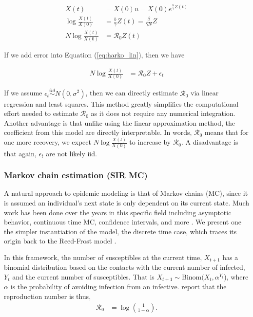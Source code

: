 \documentclass[12pt]{article}
\newcommand{\rr}{\ensuremath{\mathcal{R}_0}}
\begin{document}
\begin{align}
  X(t) &= X(0) u  = X(0) e^{\frac{b}{\gamma}Z(t)} \nonumber\\
  \log \frac{X(t)}{X(0)} &=  \frac{b}{\gamma}Z(t) =  \frac{\beta}{\gamma N} Z \nonumber\\
  N\log \frac{X(t)}{X(0)} &=  \rr Z(t) \label{eq:harko_lin}
\end{align}

If we add error into Equation (\ref{eq:harko_lin}), then we have

\begin{align}
N  \log \frac{X(t)}{X(0)} &=  \rr Z  + \epsilon_t\label{eq:r0_harko}
\end{align}

If we assume $\epsilon_t \overset{iid}{\sim}N(0, \sigma^2)$, then we can directly estimate $\rr$ via linear regression and least squares.  This method greatly simplifies the computational effort needed to estimate $\rr$ as it does not require any numerical integration.  Another advantage is that unlike using the linear approximation method, the coefficient from this model are directly interpretable.  In words, $\rr$ means that for one more recovery, we expect $N \log \frac{X(t)}{X(0)}$ to increase by $\rr$.  A disadvantage is that again, $\epsilon_t$ are  not likely iid.

\subsubsection{Markov chain estimation (SIR MC)}
A natural approach to epidemic modeling is that of Markov chains (MC), since it is assumed an individual's next state is only dependent on its current state.  Much work has been done over the years in this specific field including asymptotic behavior, continuous time MC, confidence intervals, and more \citep{jacquez1991,gani1995,daley2001epidemic}.  We present one the simpler instantiation of the model, the discrete time case, which traces its origin back to the Reed-Frost model \citep{abbey1952}.

In this framework, the number of susceptibles at the current time, $X_{t+1}$ has a binomial distribution based on the contacts with the current number of infected, $Y_t$ and the current number of susceptibles.  That is $X_{t+1} \sim \text{Binom}(X_t, \alpha^{Y_t}$), where $\alpha$ is the probability of avoiding infection from an infective.  \cite{barbour2004} report that the reproduction number is thus,
\begin{align}\label{eq:r0-mc}
\rr &= \log \left ( \frac{1}{1-\alpha}\right ).
\end{align}
\end{document}
